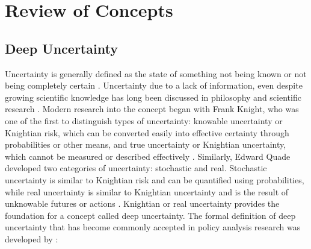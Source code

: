 \chapter{Review of Concepts}
\label{chapter-review}

\begin{abstract}
    The purpose of this chapter is to provide background knowledge and definitions of key concepts that are essential when addressing the identified research question. First, the concept of deep uncertainty is codified in \cref{review-uncertainty}. \cref{review-robustness} investigates recognized definitions of robustness in literature. Then, \cref{review-methods} explores the foundations and key concepts for each of the selected robust decision support methods. Finally, the stylized policy problem identified in the research definition is discussed in \cref{review-problems}, along with the relevant policy implementation structures.
\end{abstract}

\newpage

\section{Deep Uncertainty}\label{review-uncertainty}
Uncertainty is generally defined as the state of something not being known or not being completely certain \citep{def:uncertain}. Uncertainty due to a lack of information, even despite growing scientific knowledge has long been discussed in philosophy and scientific research \citep{Tannert892}. Modern research into the concept began with Frank Knight, who was one of the first to distinguish types of uncertainty: knowable uncertainty or Knightian risk, which can be converted easily into effective certainty through probabilities or other means, and true uncertainty or Knightian uncertainty, which cannot be measured or described effectively \citep{Knight1921}. Similarly, Edward Quade developed two categories of uncertainty: stochastic and real. Stochastic uncertainty is similar to Knightian risk and can be quantified using probabilities, while real uncertainty is similar to Knightian uncertainty and is the result of unknowable futures or actions \citep{Quade1989}. Knightian or real uncertainty provides the foundation for a concept called deep uncertainty. The formal definition of deep uncertainty that has become commonly accepted in policy analysis research was developed by \citet{Lempert2003}: 

